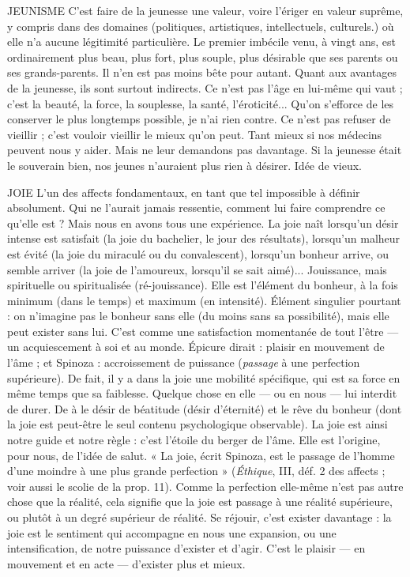 {JEUNISME C’est faire de la jeunesse une valeur, voire l’ériger en valeur
suprême, y compris dans des domaines (politiques, artistiques,
intellectuels, culturels.) où elle n’a aucune légitimité particulière. Le premier
imbécile venu, à vingt ans, est ordinairement plus beau, plus fort, plus souple,
plus désirable que ses parents ou ses grands-parents. Il n’en est pas moins bête
pour autant. Quant aux avantages de la jeunesse, ils sont surtout indirects. Ce
n'est pas l’âge en lui-même qui vaut ; c’est la beauté, la force, la souplesse, la
santé, l’éroticité... Qu'on s'efforce de les conserver le plus longtemps possible,
je n’ai rien contre. Ce n’est pas refuser de vieillir ; c’est vouloir vieillir le mieux
qu'on peut. Tant mieux si nos médecins peuvent nous y aider. Mais ne leur
demandons pas davantage. Si la jeunesse était le souverain bien, nos jeunes
n'auraient plus rien à désirer. Idée de vieux.

JOIE L'un des affects fondamentaux, en tant que tel impossible à définir
absolument. Qui ne l’aurait jamais ressentie, comment lui faire comprendre
ce qu’elle est ? Mais nous en avons tous une expérience. La joie naît
lorsqu’un désir intense est satisfait (la joie du bachelier, le jour des résultats),
lorsqu'un malheur est évité (la joie du miraculé ou du convalescent), lorsqu'un
bonheur arrive, ou semble arriver (la joie de l’amoureux, lorsqu'il se sait
aimé)... Jouissance, mais spirituelle ou spiritualisée (ré-jouissance). Elle est
l'élément du bonheur, à la fois minimum (dans le temps) et maximum (en
intensité). Élément singulier pourtant : on n’imagine pas le bonheur sans elle
(du moins sans sa possibilité), mais elle peut exister sans lui. C’est comme une
satisfaction momentanée de tout l’être — un acquiescement à soi et au monde.
Épicure dirait : plaisir en mouvement de l’âme ; et Spinoza : accroissement de
puissance ({\it passage} à une perfection supérieure). De fait, il y a dans la joie une
mobilité spécifique, qui est sa force en même temps que sa faiblesse. Quelque
chose en elle — ou en nous — lui interdit de durer. De à le désir de béatitude
(désir d’éternité) et le rêve du bonheur (dont la joie est peut-être le seul
contenu psychologique observable). La joie est ainsi notre guide et notre règle :
c’est l'étoile du berger de l’âme. Elle est l’origine, pour nous, de l’idée de salut.
« La joie, écrit Spinoza, est le passage de l’homme d’une moindre à une plus
grande perfection » ({\it Éthique}, III, déf. 2 des affects ; voir aussi le scolie de la
prop. 11). Comme la perfection elle-même n’est pas autre chose que la réalité,
cela signifie que la joie est passage à une réalité supérieure, ou plutôt à un degré
supérieur de réalité. Se réjouir, c’est exister davantage : la joie est le sentiment
qui accompagne en nous une expansion, ou une intensification, de notre puissance
d'exister et d’agir. C’est le plaisir — en mouvement et en acte — d’exister
plus et mieux.

}
